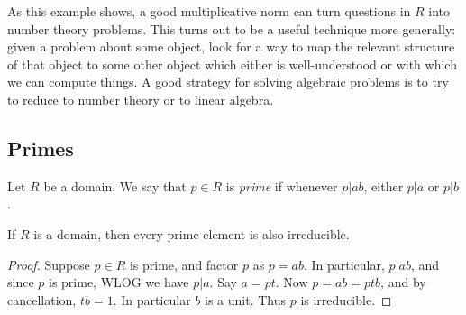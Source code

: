 \documentclass{article}
\begin{document}
As this example shows, a good multiplicative norm can turn questions in $R$ into number theory problems. This turns out to be a useful technique more generally: given a problem about some object, look for a way to map the relevant structure of that object to some other object which either is well-understood or with which we can compute things. A good strategy for solving algebraic problems is to try to reduce to number theory or to linear algebra.

\subsection*{Primes}

\begin{dfn}
Let $R$ be a domain. We say that $p \in R$ is \emph{prime} if whenever $p|ab$, either $p|a$ or $p|b$.
\end{dfn}

\begin{prop}
If $R$ is a domain, then every prime element is also irreducible.
\end{prop}

\begin{proof}
Suppose $p \in R$ is prime, and factor $p$ as $p = ab$. In particular, $p|ab$, and since $p$ is prime, WLOG we have $p|a$. Say $a = pt$. Now $p = ab = ptb$, and by cancellation, $tb = 1$. In particular $b$ is a unit. Thus $p$ is irreducible.
\end{proof}
\end{document}
